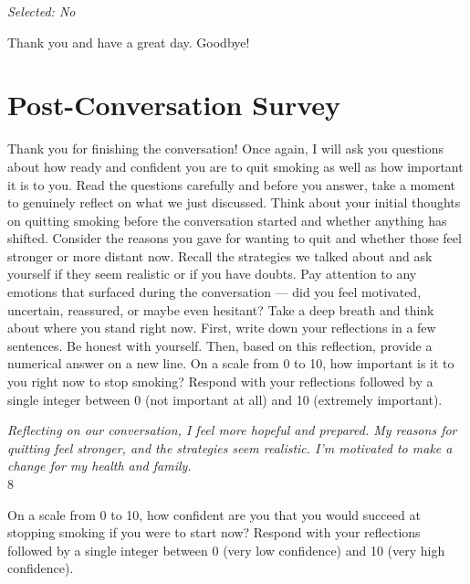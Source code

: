 \begin{clientbox}
	\textit{Selected: No}
\end{clientbox}

\begin{counsellorbox}
	Thank you and have a great day. Goodbye!
\end{counsellorbox}

\section*{Post-Conversation Survey}

\begin{researcherbox}
	Thank you for finishing the conversation! Once again, I will ask you questions about how ready and confident you are to quit smoking as well as how important it is to you. Read the questions carefully and before you answer, take a moment to genuinely reflect on what we just discussed. Think about your initial thoughts on quitting smoking before the conversation started and whether anything has shifted. Consider the reasons you gave for wanting to quit and whether those feel stronger or more distant now. Recall the strategies we talked about and ask yourself if they seem realistic or if you have doubts. Pay attention to any emotions that surfaced during the conversation — did you feel motivated, uncertain, reassured, or maybe even hesitant? Take a deep breath and think about where you stand right now. First, write down your reflections in a few sentences. Be honest with yourself. Then, based on this reflection, provide a numerical answer on a new line. On a scale from 0 to 10, how important is it to you right now to stop smoking? Respond with your reflections followed by a single integer between 0 (not important at all) and 10 (extremely important).
\end{researcherbox}

\begin{clientbox}
	\textit{Reflecting on our conversation, I feel more hopeful and prepared. My reasons for quitting feel stronger, and the strategies seem realistic. I'm motivated to make a change for my health and family.} \\
	8
\end{clientbox}

\begin{researcherbox}
	On a scale from 0 to 10, how confident are you that you would succeed at stopping smoking if you were to start now? Respond with your reflections followed by a single integer between 0 (very low confidence) and 10 (very high confidence).
\end{researcherbox}


